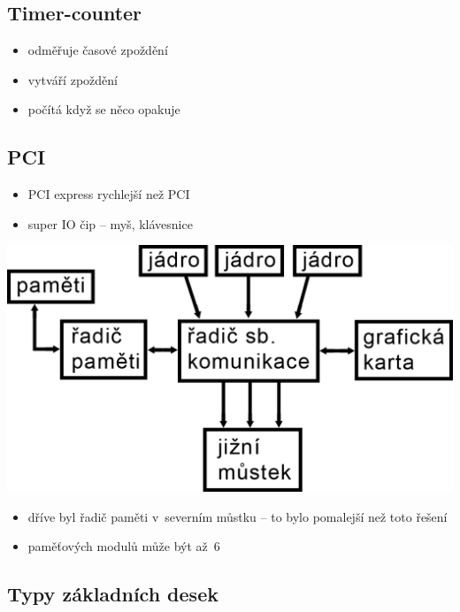 \documentclass[a4paper,12pt]{article}
\providecommand{\tightlist}{%
\setlength{\itemsep}{0pt}\setlength{\parskip}{0pt}}
\begin{document}
\subsection{Timer-counter}

\begin{itemize}
  \tightlist
  \item odměřuje časové zpoždění
  \item vytváří zpoždění
  \item počítá když se něco opakuje
\end{itemize}
  
\subsection{PCI}
\begin{itemize}
  \tightlist
  \item PCI express rychlejší než PCI
  \item super IO čip -- myš, klávesnice
\end{itemize}

\includegraphics{ref/blokove-schema-procesoru-s-jednim-cipem.png}

\begin{itemize}
  \tightlist
  \item dříve byl řadič paměti v~severním můstku -- to bylo pomalejší než toto řešení
  \item paměťových modulů může být až~6
\end{itemize}

\subsection{Typy základních desek}
\end{document}
